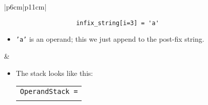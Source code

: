 \begin{center}
\begin{longtable}{ |p{6cm}|p{11cm}| }
        \hline
        \hline
             \\
        
        \hline
        {
                \begin{verbatim}
                    infix_string[i=3] = 'a'
                \end{verbatim}
            }
            \begin{itemize}
                \item \texttt{'a'} is an operand; this we just append to the post-fix string.
            \end{itemize}
            &  
                \begin{itemize}
                    \item The stack looks like this: 
                        {
                        \begin{center}
                            \begin{tabular}{ c }
                                \texttt{OperandStack =} \\ \\
                            \end{tabular}
                            \begin{bytefield}{10}
                                 \\
                            \end{bytefield}
                        \end{center}
                        }
                    

\end{itemize}
\end{longtable}
\end{center}
